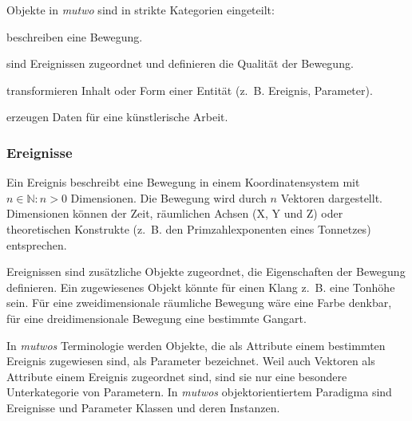 \documentclass[12pt,a4paper,ngerman]{article}
\begin{document}
Objekte in \emph{mutwo} sind in strikte Kategorien eingeteilt:

\bigskip

\hspace{0.5cm}
\begin{minipage}{0.95\textwidth}
    \begin{description}[style=multiline, leftmargin=2.25cm, font=\normalfont\emph]
        \item[Ereignisse] beschreiben eine Bewegung.
        \item[Parameter] sind Ereignissen zugeordnet und definieren die Qualität der Bewegung.
        \item[Übersetzer] transformieren Inhalt oder Form einer Entität (z.~B. Ereignis, Parameter).
        \item[Generatoren] erzeugen Daten für eine künstlerische Arbeit.
    \end{description}
\end{minipage}

\subsubsection{Ereignisse}
\label{eventDefinitions}

Ein Ereignis beschreibt eine Bewegung in einem Koordinatensystem mit $n\in\mathbb{N}:n>0$ Dimensionen.
Die Bewegung wird durch $n$ Vektoren dargestellt.
Dimensionen können der Zeit, räumlichen Achsen (X, Y und Z) oder theoretischen Konstrukte (z.~B. den Primzahlexponenten eines Tonnetzes) entsprechen.

\bigskip

Ereignissen sind zusätzliche Objekte zugeordnet, die Eigenschaften der Bewegung definieren.
Ein zugewiesenes Objekt könnte für einen Klang z.~B. eine Tonhöhe sein.
Für eine zweidimensionale räumliche Bewegung wäre eine Farbe denkbar, für eine dreidimensionale Bewegung eine bestimmte Gangart.

\bigskip

In \emph{mutwos} Terminologie werden Objekte, die als Attribute einem bestimmten Ereignis zugewiesen sind, als Parameter bezeichnet.
Weil auch Vektoren als Attribute einem Ereignis zugeordnet sind, sind sie nur eine besondere Unterkategorie von Parametern.
In \emph{mutwos} objektorientiertem Paradigma sind Ereignisse und Parameter Klassen und deren Instanzen.
\end{document}
